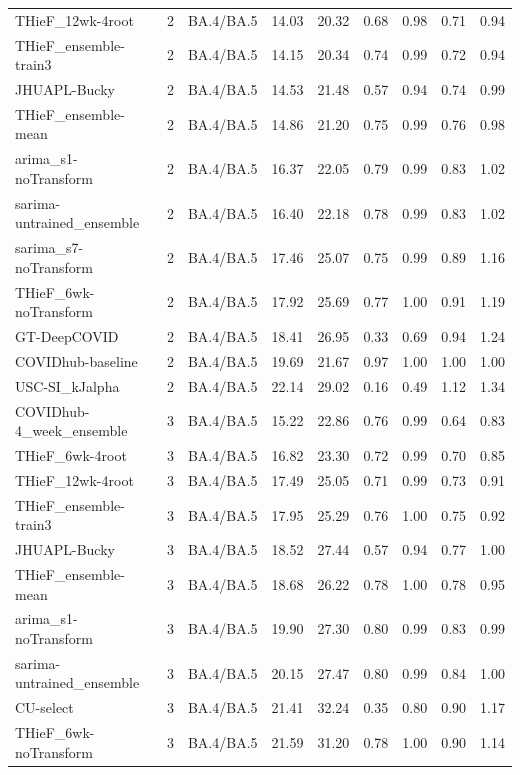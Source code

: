 \documentclass[12pt]{article}
\begin{document}
\begin{longtable}{lrlrrrrrr}
  THieF\_12wk-4root & 2 & BA.4/BA.5 & 14.03 & 20.32 & 0.68 & 0.98 & 0.71 & 0.94 \\ 
  THieF\_ensemble-train3 & 2 & BA.4/BA.5 & 14.15 & 20.34 & 0.74 & 0.99 & 0.72 & 0.94 \\ 
  JHUAPL-Bucky & 2 & BA.4/BA.5 & 14.53 & 21.48 & 0.57 & 0.94 & 0.74 & 0.99 \\ 
  THieF\_ensemble-mean & 2 & BA.4/BA.5 & 14.86 & 21.20 & 0.75 & 0.99 & 0.76 & 0.98 \\ 
  arima\_s1-noTransform & 2 & BA.4/BA.5 & 16.37 & 22.05 & 0.79 & 0.99 & 0.83 & 1.02 \\ 
  sarima-untrained\_ensemble & 2 & BA.4/BA.5 & 16.40 & 22.18 & 0.78 & 0.99 & 0.83 & 1.02 \\ 
  sarima\_s7-noTransform & 2 & BA.4/BA.5 & 17.46 & 25.07 & 0.75 & 0.99 & 0.89 & 1.16 \\ 
  THieF\_6wk-noTransform & 2 & BA.4/BA.5 & 17.92 & 25.69 & 0.77 & 1.00 & 0.91 & 1.19 \\ 
  GT-DeepCOVID & 2 & BA.4/BA.5 & 18.41 & 26.95 & 0.33 & 0.69 & 0.94 & 1.24 \\ 
  COVIDhub-baseline & 2 & BA.4/BA.5 & 19.69 & 21.67 & 0.97 & 1.00 & 1.00 & 1.00 \\ 
  USC-SI\_kJalpha & 2 & BA.4/BA.5 & 22.14 & 29.02 & 0.16 & 0.49 & 1.12 & 1.34 \\ 
  COVIDhub-4\_week\_ensemble & 3 & BA.4/BA.5 & 15.22 & 22.86 & 0.76 & 0.99 & 0.64 & 0.83 \\ 
  THieF\_6wk-4root & 3 & BA.4/BA.5 & 16.82 & 23.30 & 0.72 & 0.99 & 0.70 & 0.85 \\ 
  THieF\_12wk-4root & 3 & BA.4/BA.5 & 17.49 & 25.05 & 0.71 & 0.99 & 0.73 & 0.91 \\ 
  THieF\_ensemble-train3 & 3 & BA.4/BA.5 & 17.95 & 25.29 & 0.76 & 1.00 & 0.75 & 0.92 \\ 
  JHUAPL-Bucky & 3 & BA.4/BA.5 & 18.52 & 27.44 & 0.57 & 0.94 & 0.77 & 1.00 \\ 
  THieF\_ensemble-mean & 3 & BA.4/BA.5 & 18.68 & 26.22 & 0.78 & 1.00 & 0.78 & 0.95 \\ 
  arima\_s1-noTransform & 3 & BA.4/BA.5 & 19.90 & 27.30 & 0.80 & 0.99 & 0.83 & 0.99 \\ 
  sarima-untrained\_ensemble & 3 & BA.4/BA.5 & 20.15 & 27.47 & 0.80 & 0.99 & 0.84 & 1.00 \\ 
  CU-select & 3 & BA.4/BA.5 & 21.41 & 32.24 & 0.35 & 0.80 & 0.90 & 1.17 \\ 
  THieF\_6wk-noTransform & 3 & BA.4/BA.5 & 21.59 & 31.20 & 0.78 & 1.00 & 0.90 & 1.14 \\ 

\end{longtable}
\end{document}
